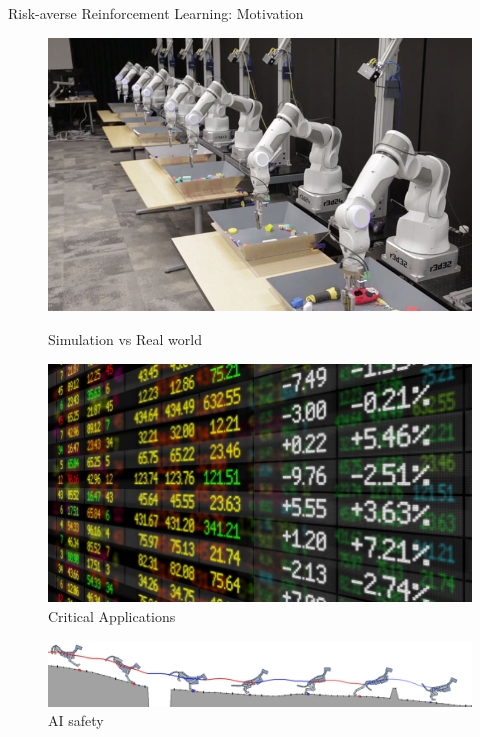 \documentclass{beamer}
\begin{document}
\begin{frame}{Risk-averse Reinforcement Learning: Motivation}
\begin{figure}
    \centering
    \begin{minipage}{0.45\textwidth}
        \centering
        \includegraphics[width=0.87\linewidth]{gfx/Deep-Learning-for-Robots.jpg}
        \caption{Simulation vs Real world}
    \end{minipage}\hfill
    \begin{minipage}{0.45\textwidth}
        \centering
        \includegraphics[width=\linewidth]{gfx/stock_market.jpg}
        \caption{Critical Applications}
    \end{minipage}
\end{figure}

\begin{figure}
\includegraphics[width=\linewidth]{gfx/running_tiger.png}
\caption{AI safety}
\end{figure}
\end{frame}
\end{document}
